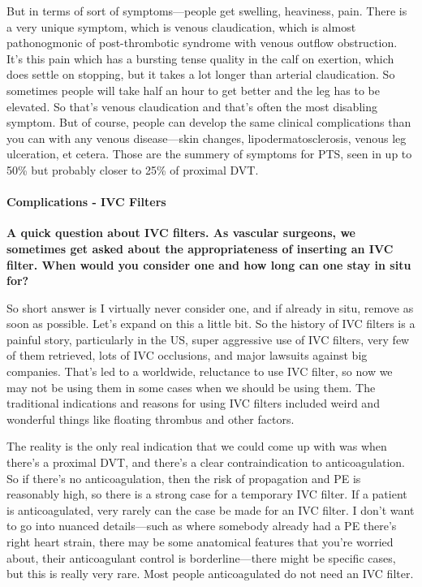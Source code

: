 \documentclass[
]{book}
\begin{document}
But in terms of sort of symptoms---people get swelling, heaviness, pain.
There is a very unique symptom, which is venous claudication, which is
almost pathonogmonic of post-thrombotic syndrome with venous outflow
obstruction. It's this pain which has a bursting tense quality in the
calf on exertion, which does settle on stopping, but it takes a lot
longer than arterial claudication. So sometimes people will take half an
hour to get better and the leg has to be elevated. So that's venous
claudication and that's often the most disabling symptom. But of course,
people can develop the same clinical complications than you can with any
venous disease---skin changes, lipodermatosclerosis, venous leg
ulceration, et cetera. Those are the summery of symptoms for PTS, seen
in up to 50\% but probably closer to 25\% of proximal DVT.

\hypertarget{complications---ivc-filters}{%
\paragraph{Complications - IVC Filters}\label{complications---ivc-filters}}

\textbf{A quick question about IVC filters. As vascular surgeons, we sometimes
get asked about the appropriateness of inserting an IVC filter. When
would you consider one and how long can one stay in situ for?}

So short answer is I virtually never consider one, and if already in
situ, remove as soon as possible. Let's expand on this a little bit. So
the history of IVC filters is a painful story, particularly in the US,
super aggressive use of IVC filters, very few of them retrieved, lots of
IVC occlusions, and major lawsuits against big companies. That's led to
a worldwide, reluctance to use IVC filter, so now we may not be using
them in some cases when we should be using them. The traditional
indications and reasons for using IVC filters included weird and
wonderful things like floating thrombus and other factors.

The reality is the only real indication that we could come up with was
when there's a proximal DVT, and there's a clear contraindication to
anticoagulation. So if there's no anticoagulation, then the risk of
propagation and PE is reasonably high, so there is a strong case for a
temporary IVC filter. If a patient is anticoagulated, very rarely can
the case be made for an IVC filter. I don't want to go into nuanced
details---such as where somebody already had a PE there's right heart
strain, there may be some anatomical features that you're worried about,
their anticoagulant control is borderline---there might be specific
cases, but this is really very rare. Most people anticoagulated do not
need an IVC filter.
\end{document}
